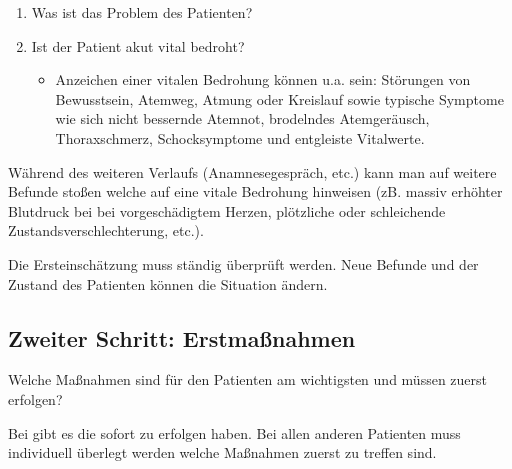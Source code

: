 \begin{enumerate}
    \item Was ist das Problem des Patienten?
    \item Ist der Patient akut vital bedroht?
    \begin{itemize}
        \item Anzeichen einer vitalen Bedrohung k\"onnen u.a. sein: St\"orungen
        von Be\-wusstsein, Atemweg, Atmung oder Kreislauf sowie typische
        Symptome wie sich nicht bessernde Atemnot, brodelndes
        Atem\-ge\-r\"ausch, Thoraxschmerz, Schocksymptome und entgleiste
        Vital\-werte.
    \end{itemize}
\end{enumerate}



W\"ahrend des weiteren Verlaufs (Anamnesegespr\"ach, etc.) kann man auf
weitere Befunde sto{\ss}en welche auf eine vitale Be\-drohung hinweisen
(zB. massiv erh\"ohter Blutdruck bei bei vor\-ge\-sch\"adigtem Herzen,
pl\"otzliche oder schleichende Zustands\-verschlechterung, etc.). 

Die Ersteinsch\"atzung muss st\"andig \"uberpr\"uft werden. Neue Befunde
und der Zustand des Patienten k\"onnen die Situation \"andern.

\subsection{Zweiter Schritt: Erstma{\ss}nahmen}

Welche Ma{\ss}nahmen sind f\"ur den Patienten am wichtigsten und
m\"ussen zuerst erfolgen? 



Bei  gibt es  die sofort zu erfolgen haben. Bei
allen anderen Patienten muss individuell \"uberlegt werden welche Ma{\ss}nahmen zuerst zu treffen sind.

